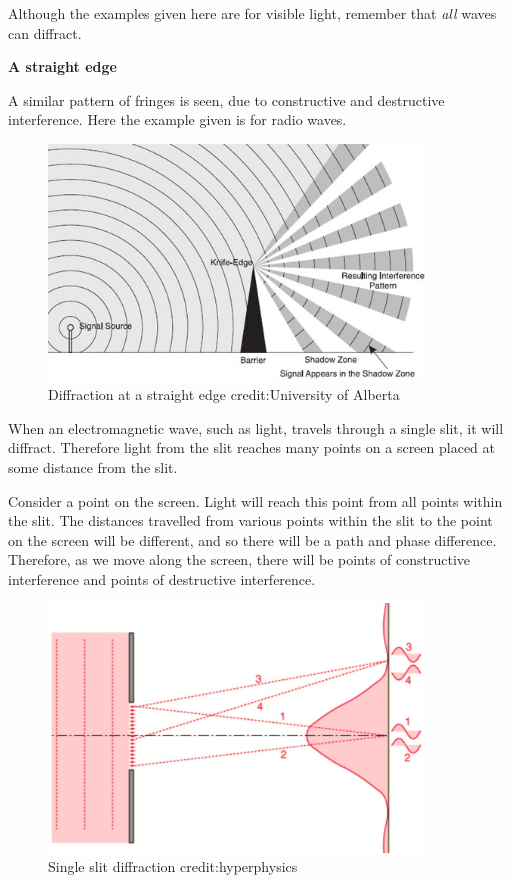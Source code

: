 \documentclass[revision-guide.tex]{subfiles}
\begin{document}
Although the examples given here are for visible light, remember that \emph{all} waves can diffract.

\textbf{A straight edge}

A similar pattern of fringes is seen, due to constructive and destructive interference. Here the example given is for radio waves.

\begin{figure}[h!]
\centering
\includegraphics[width=10cm]{figs/chapt-7/edge.jpg}
\caption{Diffraction at a straight edge {credit:University of Alberta}}
\end{figure}


When an electromagnetic wave, such as light, travels through a single slit, it will diffract. Therefore light from the slit reaches many points on a screen placed at some distance from the slit.

Consider a point on the screen. Light will reach this point from all points within the slit. The distances travelled from various points within the slit to the point on the screen will be different, and so there will be a path and phase difference. Therefore, as we move along the screen, there will be points of constructive interference and points of destructive interference.

\begin{figure}[h!]
\centering
\includegraphics[width=10cm]{figs/chapt-7/singleslit.JPG}
\caption{Single slit diffraction {credit:hyperphysics}}
\end{figure}
\end{document}
